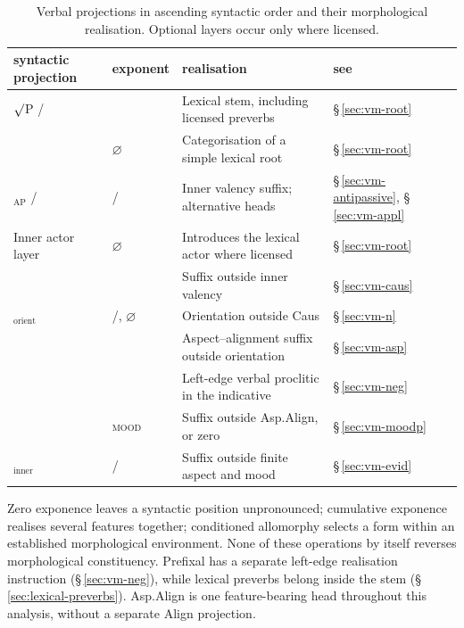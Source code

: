\begin{table}
  \footnotesize
  \caption{Verbal projections in ascending syntactic order and their
  morphological realisation. Optional layers occur only where licensed.}
  \label{tab:vm-projections}
  \begin{tabularx}{\textwidth}{L l L l}
    \toprule
    {\sc syntactic projection} & {\sc exponent} & {\sc realisation} &
    {\sc see} \\
    \midrule
    $\surd$P /  & \Stem{} & Lexical stem, including licensed preverbs
                 & §\,\ref{sec:vm-root} \\
     & $\varnothing$ & Categorisation of a simple lexical root
                 & §\,\ref{sec:vm-root} \\
    $_{\mathrm{AP}}$ / 
                 & \Antip{} / \Appl{} & Inner valency suffix; alternative heads
                 & §\,\ref{sec:vm-antipassive}, §\,\ref{sec:vm-appl} \\
    Inner actor layer & $\varnothing$ & Introduces the lexical actor where licensed
                 & §\,\ref{sec:vm-root} \\
     & \Caus{} & Suffix outside inner valency
                 & §\,\ref{sec:vm-caus} \\
    $_{\mathrm{orient}}$
                 & /, $\varnothing$ & Orientation outside Caus
                 & §\,\ref{sec:vm-n} \\
     &  & Aspect--alignment suffix outside orientation
                 & §\,\ref{sec:vm-asp} \\
     & \Neg{} & Left-edge verbal proclitic in the indicative
                 & §\,\ref{sec:vm-neg} \\
     & \textsc{mood} & Suffix outside Asp.Align, or zero
                 & §\,\ref{sec:vm-moodp} \\
    $_\text{inner}$ & / & Suffix outside finite aspect and mood
                 & §\,\ref{sec:vm-evid} \\
    \bottomrule
  \end{tabularx}
\end{table}

\noindent Zero exponence leaves a syntactic position unpronounced;
cumulative exponence realises several features together; conditioned allomorphy
selects a form within an established morphological environment. None of these
operations by itself reverses morphological constituency. Prefixal \Neg{}
has a separate left-edge realisation instruction (§\,\ref{sec:vm-neg}), while
lexical preverbs belong inside the stem (§\,\ref{sec:lexical-preverbs}).
Asp.Align is one feature-bearing head throughout this analysis, without a
separate Align projection.

